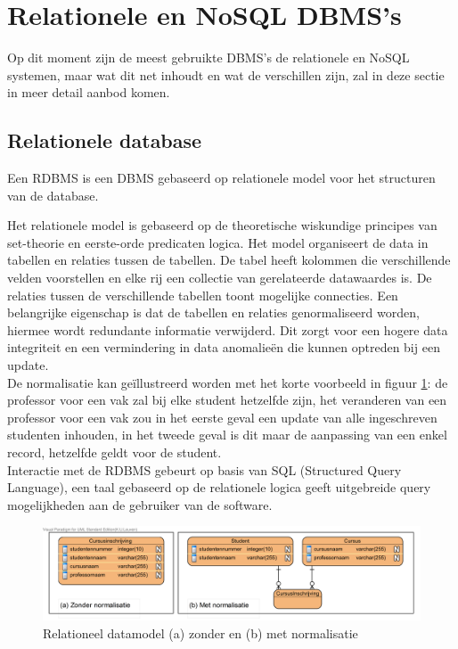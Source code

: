 \section{Relationele en NoSQL DBMS's} 
Op dit moment zijn de meest gebruikte DBMS's de relationele en NoSQL systemen, maar wat dit net inhoudt en wat de verschillen zijn, zal in deze sectie in meer detail aanbod komen. 

\subsection{Relationele database}
Een RDBMS is een DBMS gebaseerd op relationele model voor het structuren van de database.

Het relationele model is gebaseerd op de theoretische wiskundige principes van set-theorie en eerste-orde predicaten logica. Het model organiseert de data in tabellen en relaties tussen de tabellen. De tabel heeft kolommen die verschillende velden voorstellen en elke rij een collectie van gerelateerde datawaardes is. De relaties tussen de verschillende tabellen toont mogelijke connecties. Een belangrijke eigenschap is dat de tabellen en relaties genormaliseerd worden, hiermee wordt redundante informatie verwijderd. Dit zorgt voor een hogere data integriteit en een vermindering in data anomalieën die kunnen optreden bij een update.\cite{Elmasri:2010:FDS:1855347} \\
De normalisatie kan geïllustreerd worden met het korte voorbeeld in figuur \ref{fig:Relationeel-Model-Normalisatie}: de professor voor een vak zal bij elke student hetzelfde zijn, het veranderen van een professor voor een vak zou in het eerste geval een update van alle ingeschreven studenten inhouden, in het tweede geval is dit maar de aanpassing van een enkel record, hetzelfde geldt voor de student. \\
Interactie met de RDBMS gebeurt op basis van SQL (Structured Query Language), een taal gebaseerd op de relationele logica geeft uitgebreide query mogelijkheden aan de gebruiker van de software.   
\begin{figure}[h!]
\centering
\includegraphics[width=\linewidth]{img/Relationeel-Model-Normalisatie.png}
\caption[Relationeel datamodel (a) zonder en (b) met normalisatie]{Relationeel datamodel (a) zonder en (b) met normalisatie}
\label{fig:Relationeel-Model-Normalisatie}
\end{figure}

